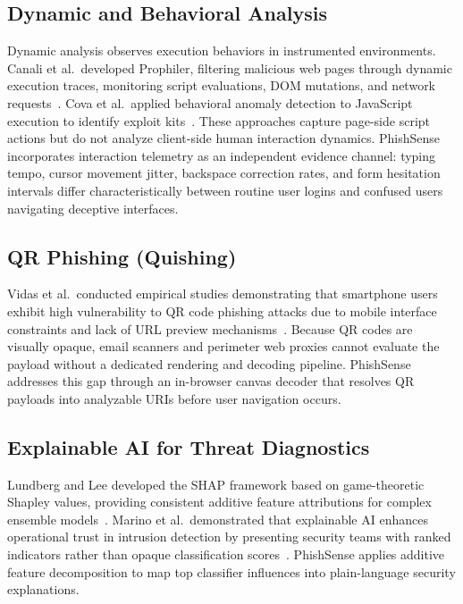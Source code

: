 \documentclass[conference]{IEEEtran}
\begin{document}
\subsection{Dynamic and Behavioral Analysis}
Dynamic analysis observes execution behaviors in instrumented environments.
Canali et al.\ developed Prophiler, filtering malicious web pages through dynamic execution traces,
monitoring script evaluations, DOM mutations, and network requests~\cite{ref12}.
Cova et al.\ applied behavioral anomaly detection to JavaScript execution to identify exploit kits~\cite{ref13}.
These approaches capture page-side script actions but do not analyze client-side human interaction
dynamics.
PhishSense incorporates interaction telemetry as an independent evidence channel: typing tempo,
cursor movement jitter, backspace correction rates, and form hesitation intervals differ
characteristically between routine user logins and confused users navigating deceptive interfaces.

\subsection{QR Phishing (Quishing)}
Vidas et al.\ conducted empirical studies demonstrating that smartphone users exhibit high
vulnerability to QR code phishing attacks due to mobile interface constraints and lack of URL preview
mechanisms~\cite{ref10}.
Because QR codes are visually opaque, email scanners and perimeter web proxies cannot evaluate the
payload without a dedicated rendering and decoding pipeline.
PhishSense addresses this gap through an in-browser canvas decoder that resolves QR payloads into
analyzable URIs before user navigation occurs.

\subsection{Explainable AI for Threat Diagnostics}
Lundberg and Lee developed the SHAP framework based on game-theoretic Shapley values, providing
consistent additive feature attributions for complex ensemble models~\cite{ref15}.
Marino et al.\ demonstrated that explainable AI enhances operational trust in intrusion detection
by presenting security teams with ranked indicators rather than opaque classification scores~\cite{ref16}.
PhishSense applies additive feature decomposition to map top classifier influences into plain-language
security explanations.
\end{document}
